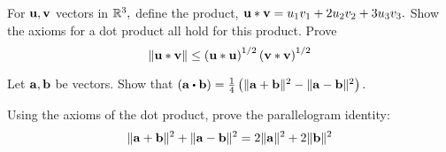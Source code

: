 \begin{enumialphparenastyle}
\begin{ex} For ${\bf u},{\bf v}$ vectors in $\mathbb{R}^{3},$ define the product, 
${\bf u}\ast {\bf v} =  u_{1}v_{1}+2u_{2}v_{2}+3u_{3}v_{3}.$ Show the axioms
for a dot product all hold for this product. Prove
\begin{equation*}
\| {\bf u}\ast {\bf v}\| \leq \left({\bf u}\ast {\bf u}\right)
^{1/2}\left({\bf v}\ast {\bf v}\right) ^{1/2}
\end{equation*}
\end{ex}


\begin{ex} Let ${\bf a},{\bf b}$ be vectors. Show that $\tup{\vect{a}\dotprod \vect{b}} =\frac{1}{4}\tup{\vectlength
\vect{a}+\vect{b}\vectlength ^{2}-\vectlength \vect{a}-\vect{b}\vectlength ^{2}} .$
\end{ex}

\begin{ex} Using the axioms of the dot product, prove the parallelogram identity: 
\begin{equation*}
\| {\bf a}+{\bf b}\| ^{2}+\| {\bf a}-{\bf b}\|
^{2}=2\| {\bf a}\| ^{2}+2\| {\bf b}
\| ^{2}
\end{equation*}
\end{ex}

\end{enumialphparenastyle}